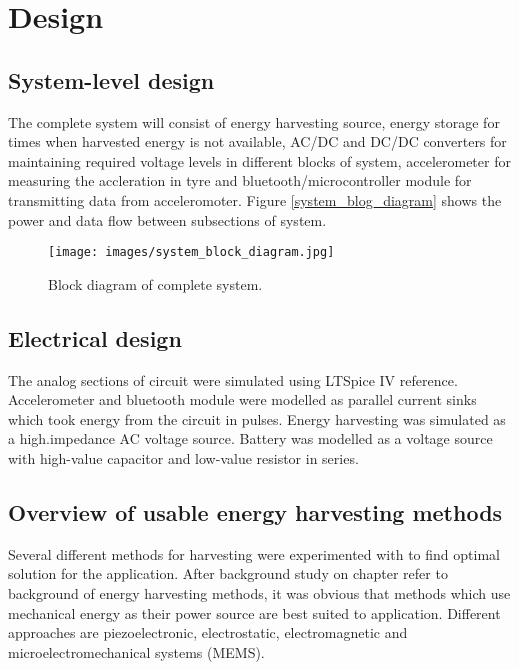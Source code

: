 \section{Design}

\subsection{System-level design}
The complete system will consist of energy harvesting source, energy storage for times when harvested energy is not available, AC/DC and DC/DC converters for maintaining required voltage levels in different blocks of system, accelerometer for measuring the accleration in tyre and bluetooth/microcontroller module for transmitting data from acceleromoter. Figure \ref{system_blog_diagram} shows the power and data flow between subsections of system. 


\begin{figure}[htb]
\begin{center}
\texttt{[image: images/system\_block\_diagram.jpg]}
\end{center}
\caption{\label{system_blog_diagram} Block diagram of complete system.}
\label{liitekuva}
\end{figure}


\subsection{Electrical design}
The analog sections of circuit were simulated using LTSpice IV {\color{red} reference}. Accelerometer and bluetooth module were modelled as parallel current sinks which took energy from the circuit in pulses. Energy harvesting was simulated as a high.impedance AC voltage source. 
Battery was modelled as a voltage source with high-value capacitor and low-value resistor in series.

\subsection{Overview of usable energy harvesting methods}
Several different methods for harvesting were experimented with to find optimal solution for the application. After background study on chapter {\color{red} refer to background} of energy harvesting methods, it was obvious that methods which use mechanical energy as their power source are best suited to application. Different approaches are piezoelectronic, electrostatic, electromagnetic and microelectromechanical systems (MEMS). 

